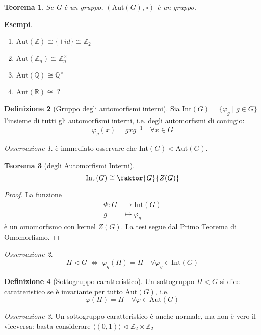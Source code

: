 \documentclass[a4paper]{article}
\newtheorem{theorem}{Teorema}[section]
\theoremstyle{remark}
\newtheorem*{remark}{Osservazione}
\theoremstyle{definition}
\newtheorem{definition}[theorem]{Definizione}
\newcommand{\Aut}[1]{\mathrm{Aut}\left( #1 \right)}
\newcommand{\Int}[1]{\mathrm{Int}\left( #1 \right)}
\newcommand{\fun}[5]{
	\begin{align*}
	#1 \colon #2 &\to #3 \\
	#4 &\mapsto #5
	\end{align*}
}
\begin{document}
\begin{multicols}{2}
\begin{theorem}
	Se G è un gruppo, $ \left(\Aut{G}, \circ\right) $ è un gruppo.
\end{theorem}

\textbf{Esempi}.
\begin{enumerate}
	\item $ \Aut{\mathbb{Z}} \cong \{\pm id\} \cong \mathbb{Z}_2 $
	\item $ \Aut{\mathbb{Z}_n} \cong \mathbb{Z}_n^\times $
	\item $ \Aut{\mathbb{Q}} \cong \mathbb{Q}^\times $
	\item $ \Aut{\mathbb{R}} \cong \; ? $
\end{enumerate} 

\begin{definition}[Gruppo degli automorfismi interni]
	Sia $ \Int{G} = \{ \varphi_g \mid g \in G \} $ l'insieme di tutti gli automorfismi interni, i.e. degli automorfismi di coniugio: \[ \varphi_g(x) = gxg^{-1} \quad\forall x \in G \]
\end{definition}
\begin{remark}
	è immediato osservare che $ \Int{G} \lhd \Aut{G} $.
\end{remark}
\begin{theorem}[degli Automorfismi Interni]
	\[ \Int{G} \cong \faktor{G}{Z(G)} \]
\end{theorem}
\begin{proof}
	La funzione \fun{\Phi}{G}{\Int{G}}{g}{\varphi_g} è un omomorfismo con kernel $ Z(G) $. La tesi segue dal Primo Teorema di Omomorfismo.
\end{proof}

\begin{remark}
	\[ H \lhd G \;\Leftrightarrow\; \varphi_g\left(H\right) = H \quad \forall \varphi_g \in \Int{G} \]
\end{remark}

\begin{definition}[Sottogruppo caratteristico]
	Un sottogruppo $ H < G $ si dice caratteristico se è invariante per tutto $ \Aut{G} $, i.e. $$ \varphi\left(H\right) = H \quad \forall \varphi \in \Aut{G} $$
\end{definition}
\begin{remark}
	Un sottogruppo caratteristico è anche normale, ma non è vero il viceversa: basta considerare $ \langle (0, 1) \rangle \lhd \mathbb{Z}_2 \times \mathbb{Z}_2 $
\end{remark}


\end{multicols}
\end{document}
